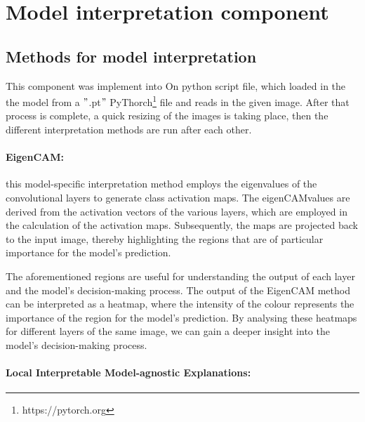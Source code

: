 


\section{Model interpretation component}\label{sec:model-interpretation2}

\subsection{Methods for model interpretation}\label{subsec:methods-for-model-interpretation}

This component was implement into On python script file, which loaded in the the model from a \("\).pt\("\) PyThorch\footnote{https://pytorch.org} file and reads in the given image.
After that process is complete, a quick resizing of the images is taking place, then the different interpretation methods are run after each other.

\paragraph{EigenCAM:}\label{par:eigencam}
this model-specific interpretation method employs the eigenvalues of the convolutional layers to generate class activation maps.
The eigenCAMvalues are derived from the activation vectors of the various layers, which are employed in the calculation of the activation maps.
Subsequently, the maps are projected back to the input image, thereby highlighting the regions that are of particular importance for the model's prediction.

The aforementioned regions are useful for understanding the output of each layer and the model's decision-making process.
The output of the EigenCAM method can be interpreted as a heatmap, where the intensity of the colour represents the importance of
the region for the model's prediction.
By analysing these heatmaps for different layers of the same image, we can gain a deeper insight into the model's decision-making process.

\paragraph{Local Interpretable Model-agnostic Explanations:}\label{par:lime}

